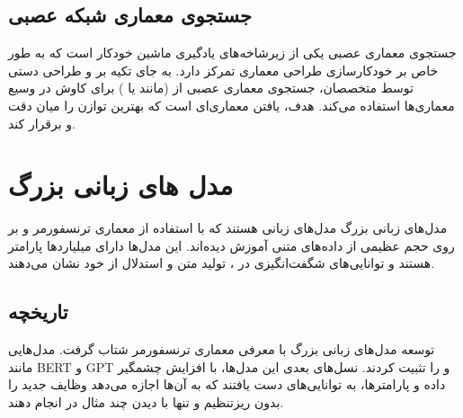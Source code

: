 \subsection{جستجوی معماری شبکه عصبی}
جستجوی معماری عصبی یکی از زیرشاخه‌های یادگیری ماشین خودکار است که به طور خاص بر خودکارسازی طراحی معماری  تمرکز دارد. به جای تکیه بر  و طراحی دستی توسط متخصصان، جستجوی معماری عصبی از  (مانند  یا ) برای کاوش در  وسیع معماری‌ها استفاده می‌کند. هدف، یافتن معماری‌ای است که بهترین توازن را میان دقت و  برقرار کند.

\section{مدل های زبانی بزرگ}
مدل‌های زبانی بزرگ مدل‌های زبانی هستند که با استفاده از معماری ترنسفورمر و بر روی حجم عظیمی از داده‌های متنی آموزش دیده‌اند. این مدل‌ها دارای میلیاردها پارامتر هستند و توانایی‌های شگفت‌انگیزی در ، تولید متن  و استدلال از خود نشان می‌دهند.

\subsection{تاریخچه}
توسعه مدل‌های زبانی بزرگ با معرفی معماری ترنسفورمر \cite{vaswani2017attention} شتاب گرفت. مدل‌هایی مانند BERT \cite{devlin2019bert} و GPT \cite{brown2020language}   و  را تثبیت کردند. نسل‌های بعدی این مدل‌ها، با افزایش چشمگیر  داده و پارامترها، به توانایی‌های  دست یافتند که به آن‌ها اجازه می‌دهد وظایف جدید را بدون ریزتنظیم و تنها با دیدن چند مثال در  انجام دهند.

